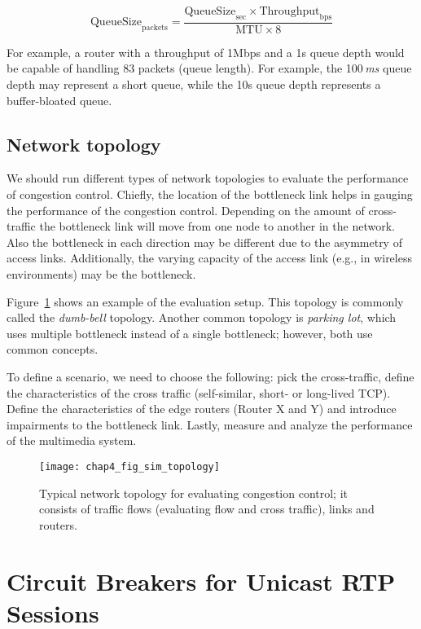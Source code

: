\begin{equation*}
  \mathrm{QueueSize}_\mathrm{packets} = 
    \frac{\mathrm{QueueSize}_\mathrm{sec} \times
    \mathrm{Throughput}_\mathrm{bps}}{\mathrm{MTU} \times \mathrm{8}}
\end{equation*}

For example, a router with a throughput of 1Mbps and a 1s queue depth would be
capable of handling 83 packets (queue length). For example, the 100\,\emph{ms}
queue depth may represent a short queue, while the 10s queue depth represents
a buffer-bloated queue.

\subsection{Network topology}

We should run different types of network topologies to evaluate the
performance of congestion control. Chiefly, the location of the bottleneck
link helps in gauging the performance of the congestion control. Depending on
the amount of cross-traffic the bottleneck link will move from one node to
another in the network. Also the bottleneck in each direction may be different
due to the asymmetry of access links. Additionally, the varying capacity of
the access link (e.g., in wireless environments) may be the bottleneck.

Figure~\ref{fig:4:topology} shows an example of the evaluation setup. This
topology is commonly called the \emph{dumb-bell} topology. Another common
topology is \emph{parking lot}, which uses multiple bottleneck instead of a
single bottleneck; however, both use common concepts. 


To define a scenario, we need to choose the following: pick the cross-traffic,
define the characteristics of the cross traffic (self-similar, short- or
long-lived TCP). Define the characteristics of the edge routers (Router X and
Y) and introduce impairments to the bottleneck link. Lastly, measure and
analyze the performance of the multimedia system. 


\begin{figure}
\texttt{[image: chap4\_fig\_sim\_topology]}
\caption{Typical network topology for evaluating congestion control; it
consists of traffic flows (evaluating flow and cross traffic), links and
routers.} 
\label{fig:4:topology}
\end{figure}



\section{Circuit Breakers for Unicast RTP Sessions}

